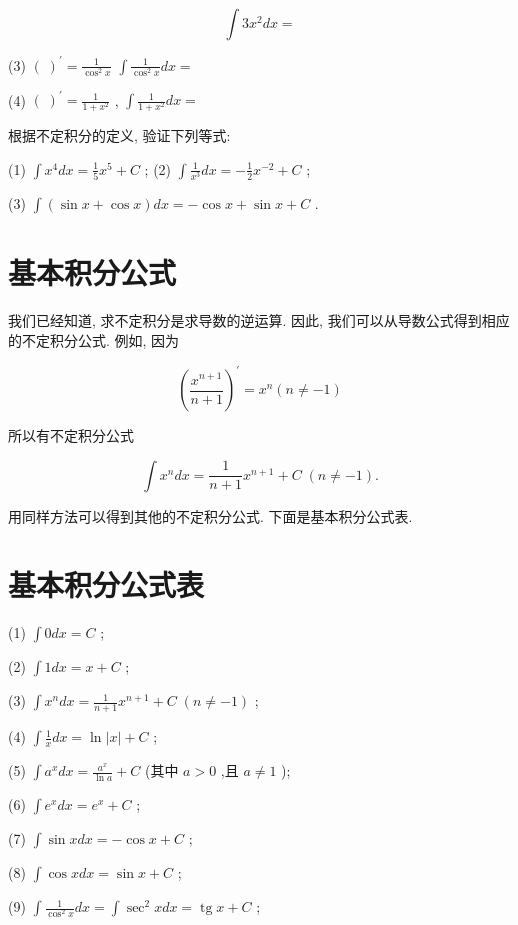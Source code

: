 \documentclass[lang=cn,newtx,10pt,scheme=chinese]{elegantbook}
\begin{document}
\begin{problemset}[练习]
\[
\int 3{x}^{2}{dx} =
\]

(3) \({\left( \;\right) }^{\prime } = \frac{1}{{\cos }^{2}x}\) \(\int \frac{1}{{\cos }^{2}x}{dx} =\)

(4) \({\left( \;\right) }^{\prime } = \frac{1}{1 + {x}^{2}}\) , \(\int \frac{1}{1 + {x}^{2}}{dx} =\)

\item 根据不定积分的定义, 验证下列等式:

(1) \(\int {x}^{4}{dx} = \frac{1}{5}{x}^{5} + C\) ; (2) \(\int \frac{1}{{x}^{3}}{dx} = - \frac{1}{2}{x}^{-2} + C\) ;

(3) \(\int \left( {\sin x + \cos x}\right) {dx} = - \cos x + \sin x + C\) .

\end{problemset}

\section{基本积分公式}

我们已经知道, 求不定积分是求导数的逆运算. 因此, 我们可以从导数公式得到相应的不定积分公式. 例如, 因为

\[
{\left( \frac{{x}^{n + 1}}{n + 1}\right) }^{\prime } = {x}^{n}\left( {n \neq - 1}\right)
\]

所以有不定积分公式

\[
\int {x}^{n}{dx} = \frac{1}{n + 1}{x}^{n + 1} + C\;\left( {n \neq - 1}\right) .
\]

用同样方法可以得到其他的不定积分公式. 下面是基本积分公式表.

\section*{基本积分公式表}

(1) \(\int {0dx} = C\) ;

(2) \(\int {1dx} = x + C\) ;

(3) \(\int {x}^{n}{dx} = \frac{1}{n + 1}{x}^{n + 1} + C\;\left( {n \neq - 1}\right)\) ;

(4) \(\int \frac{1}{x}{dx} = \ln \left| x\right| + C\) ;

(5) \(\int {a}^{x}{dx} = \frac{{a}^{x}}{\ln a} + C\) (其中 \(a > 0\) ,且 \(a \neq 1\) );

(6) \(\int {e}^{x}{dx} = {e}^{x} + C\) ;

(7) \(\int \sin {xdx} = - \cos x + C\) ;

(8) \(\int \cos {xdx} = \sin x + C\) ;

(9) \(\int \frac{1}{{\cos }^{2}x}{dx} = \int {\sec }^{2}{xdx} = \operatorname{tg}x + C\) ;
\end{document}
